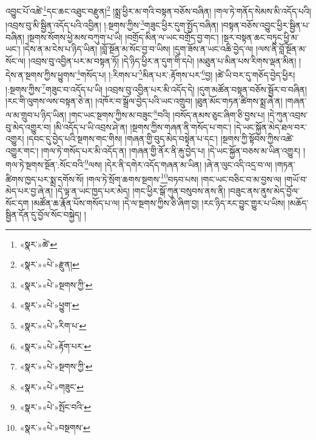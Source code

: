 འབྱུང་པོ་འཚེ་\footnote{«སྣར་»ཚེ་}དང་ཆང་འཐུང་བརྫུན།\footnote{«སྣར་»«པེ་»རྫུན།} །སྨྲ་ཕྱིར་མ་གའི་བསྟན་བཅོས་བཞིན། །གལ་ཏེ་གནོད་སེམས་མི་འདོད་པའི། །འབྲས་བུ་མི་སྦྱིན་འདོད་པའི་འབྱིན། །:སྔགས་ཀྱིས་\footnote{«སྣར་»«པེ་»སྔགས་ཀྱི་}གཟུང་ཕྱིར་དུག་སྤྱོད་བཞིན། །བསྟན་བཅོས་འབྱུང་ཕྱིར་སྦྱིན་པ་བཞིན། །སྔགས་སོགས་ཕྱེ་མས་བཀུག་པ་ཡི། །བགྲོད་མིན་ལ་ཡང་བགྲོད་བྱ་གང་། །སྔར་བསྟན་ཆང་བཏུང་ཕྱི་མ་ཡང་། །དེས་ན་མ་ངེས་པ་ཉིད་ཡིན། །བློ་སྔོན་མ་སོང་བྱ་བ་ཡིས། །དུག་ཟོས་ན་ཡང་འཆི་བྱེད་ལ། །ལས་ནི་བློ་སྔོན་མ་སོང་ལ། །འབྲས་བུ་འབྱིན་པར་མ་བསྟན་ཏོ། །དེ་ཉིད་ཕྱིར་ན་དུག་གི་དཔེ། །མཐུན་པ་མིན་པས་རིགས་ལྡན་མིན། །དེས་ན་སྔགས་ཀྱིས་ཕྱུགས་\footnote{«སྣར་»«པེ་»ཕྱུག་}གསོད་པ། །:རིགས་པ་\footnote{«སྣར་»«པེ་»རིག་པ་}མིན་པར་:རྟོགས་པར་\footnote{«སྣར་»«པེ་»རྟོག་པར་}བྱ། །ཚེ་ཡི་བར་དུ་གཅོད་བྱེད་ཕྱིར། །:སྔགས་ཀྱིས་\footnote{«སྣར་»«པེ་»སྔགས་ཀྱི་}གཟུང་བ་འདོད་པ་ཡི། །འབྲས་བུ་འབྱིན་པར་མི་འདོད་དེ། །དུག་མཚོན་བསྟན་བཅོས་སྦྱོར་བ་བཞིན། །རང་གི་ལུགས་ལས་བསྟན་ཅེ་ན། །འཁོར་བ་སྒྲོལ་བྱེད་པའི་ཡང་འགྲུབ། །ཐུན་མོང་གཏན་ཚིགས་སྨྲ་ཞེ་ན། །གཞན་ལ་མ་གྲུབ་པ་ཉིད་ཡིན། །གང་ཡང་སྔགས་ཀྱིས་མ་བཟུང་\footnote{«སྣར་»«པེ་»གཟུང་}བའི། །བསོད་ནམས་ཅུང་ཞིག་ཅི་བྱས་པ། །དེ་ཀུན་འབྲས་བུ་མེད་འགྱུར་བ། །མི་འདོད་པ་ཡི་འབྲས་ཤེ་ན། །སྔགས་ཀྱིས་གཞན་ནི་གསོད་པ་གང་། །དེ་ཡང་སྐྱོན་མེད་ཐལ་བར་འགྱུར། །དབང་དུ་བྱེད་པའི་སྔགས་གང་གིས། །གཞན་གྱི་བུད་མེད་བསྟེན་པ་དང་། །སྔགས་ཀྱི་སྟོབས་ཀྱིས་འཚེ་འགྱུར་གང་། །གལ་ཏེ་གསོད་པར་མི་འདོད་ན། །གཞན་གྱི་ནོར་ནི་རྐུ་བྱེད་པ། །དེ་ཡང་སྐྱོན་བཅས་མ་ཡིན་འགྱུར། །གལ་ཏེ་སྔགས་སྔོན་:སོང་བའི་\footnote{«སྣར་»«པེ་»སྤོང་བའི་}ལས། །དེར་ནི་དགེར་འདོད་གཞན་མ་ཡིན། །ཞེ་ན་ལུང་འདི་འདྲ་བ་ལ། །གཏན་ཚིགས་ཁྱད་པར་སྨྲ་དགོས་སོ། །གལ་ཏེ་སྲོག་ཆགས་སྔགས་\footnote{«སྣར་»«པེ་»བསྔགས་}བཏབ་པས། །གང་ཡང་བཅིང་བ་མ་བྱས་ལ། །གཡོ་བ་མེད་པར་བྱ་ཞེ་ན། །དེ་ལྟ་ན་ཡང་ཁྱད་པར་མེད། །གང་ཕྱིར་སྒོ་ཀུན་བསུབས་ནས་ནི། །བཟུང་ནས་ནུས་མེད་བྱོལ་སོང་དག །མཚོན་ཆ་རྣོན་པོས་གསོད་པ་ལ། །དེ་ལ་སྔགས་ཀྱིས་ཅི་ཞིག་བྱ། །རང་ཉིད་རང་བྱུང་གྱུར་པ་ཡིས། །མཆོད་སྦྱིན་དོན་དུ་བྱོལ་སོང་བསྐྱེད། །
